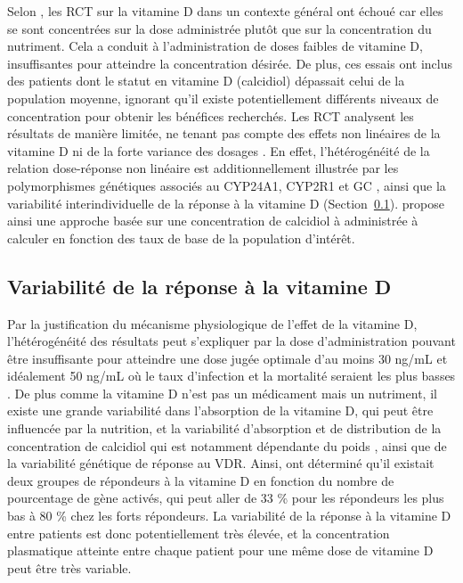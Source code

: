 \documentclass[
  a4paper,
  DIV=11,
  numbers=noendperiod,
  listof=totoc]{scrreprt}
\begin{document}
Selon \textcite{Grant.2022.nutrients}, les \ac{RCT} sur la vitamine D
dans un contexte général ont échoué car elles se sont concentrées sur la
dose administrée plutôt que sur la concentration du nutriment. Cela a
conduit à l'administration de doses faibles de vitamine D, insuffisantes
pour atteindre la concentration désirée. De plus, ces essais ont inclus
des patients dont le statut en vitamine D (calcidiol) dépassait celui de
la population moyenne, ignorant qu'il existe potentiellement différents
niveaux de concentration pour obtenir les bénéfices recherchés. Les
\ac{RCT} analysent les résultats de manière limitée, ne tenant pas
compte des effets non linéaires de la vitamine D ni de la forte variance
des dosages \autocite{Grant.2022,Grant.2018}. En effet, l'hétérogénéité
de la relation dose-réponse non linéaire est additionnellement illustrée
par les polymorphismes génétiques associés au CYP24A1, CYP2R1 et GC
\autocite{Grant.2018}, ainsi que la variabilité interindividuelle de la
réponse à la vitamine D \autocite{Vukić.2015}
(Section~\ref{sec-variabilite-reponse}). \textcite{Grant.2018} propose
ainsi une approche basée sur une concentration de calcidiol à
administrée à calculer en fonction des taux de base de la population
d'intérêt.

\subsection{Variabilité de la réponse à la vitamine
D}\label{sec-variabilite-reponse}

Par la justification du mécanisme physiologique de l'effet de la
vitamine D, l'hétérogénéité des résultats peut s'expliquer par la dose
d'administration pouvant être insuffisante pour atteindre une dose jugée
optimale d'au moins 30 ng/mL et idéalement 50 ng/mL où le taux
d'infection et la mortalité seraient les plus basses
\autocite{Wimalawansa.2022,Kaufman.2020,Borsche.2021}. De plus comme la
vitamine D n'est pas un médicament mais un nutriment, il existe une
grande variabilité dans l'absorption de la vitamine D, qui peut être
influencée par la nutrition, et la variabilité d'absorption et de
distribution de la concentration de calcidiol qui est notamment
dépendante du poids \autocite{Ekwaru.2014}, ainsi que de la variabilité
génétique de réponse au VDR. Ainsi, \textcite{Vukić.2015} ont déterminé
qu'il existait deux groupes de répondeurs à la vitamine D en fonction du
nombre de pourcentage de gène activés, qui peut aller de 33 \% pour les
répondeurs les plus bas à 80 \% chez les forts répondeurs. La
variabilité de la réponse à la vitamine D entre patients est donc
potentiellement très élevée, et la concentration plasmatique atteinte
entre chaque patient pour une même dose de vitamine D peut être très
variable.
\end{document}
